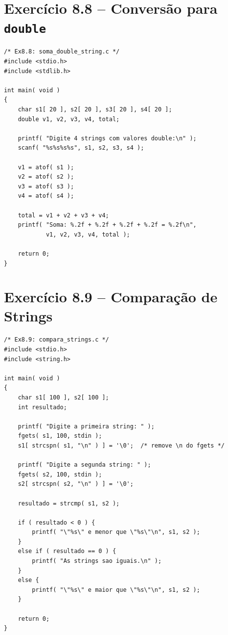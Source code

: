 \documentclass[12pt,a4paper]{article}
\begin{document}
\section{Exercício 8.8 -- Conversão para \texttt{double}}

\begin{respostabox}
\begin{lstlisting}
/* Ex8.8: soma_double_string.c */
#include <stdio.h>
#include <stdlib.h>

int main( void )
{
    char s1[ 20 ], s2[ 20 ], s3[ 20 ], s4[ 20 ];
    double v1, v2, v3, v4, total;

    printf( "Digite 4 strings com valores double:\n" );
    scanf( "%s%s%s%s", s1, s2, s3, s4 );

    v1 = atof( s1 );
    v2 = atof( s2 );
    v3 = atof( s3 );
    v4 = atof( s4 );

    total = v1 + v2 + v3 + v4;
    printf( "Soma: %.2f + %.2f + %.2f + %.2f = %.2f\n",
            v1, v2, v3, v4, total );

    return 0;
}
\end{lstlisting}
\end{respostabox}

\newpage

\section{Exercício 8.9 -- Comparação de Strings}

\begin{respostabox}
\begin{lstlisting}
/* Ex8.9: compara_strings.c */
#include <stdio.h>
#include <string.h>

int main( void )
{
    char s1[ 100 ], s2[ 100 ];
    int resultado;

    printf( "Digite a primeira string: " );
    fgets( s1, 100, stdin );
    s1[ strcspn( s1, "\n" ) ] = '\0';  /* remove \n do fgets */

    printf( "Digite a segunda string: " );
    fgets( s2, 100, stdin );
    s2[ strcspn( s2, "\n" ) ] = '\0';

    resultado = strcmp( s1, s2 );

    if ( resultado < 0 ) {
        printf( "\"%s\" e menor que \"%s\"\n", s1, s2 );
    }
    else if ( resultado == 0 ) {
        printf( "As strings sao iguais.\n" );
    }
    else {
        printf( "\"%s\" e maior que \"%s\"\n", s1, s2 );
    }

    return 0;
}
\end{lstlisting}
\end{respostabox}
\end{document}
